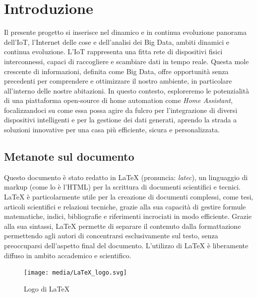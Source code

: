 \documentclass[11pt, a4paper]{article}
\begin{document}
\section{Introduzione}
Il presente progetto si inserisce nel dinamico 
e in continua evoluzione panorama dell'IoT, l'Internet delle cose
 e dell'analisi dei Big Data, ambiti dinamici e continua evoluzione. 
L'IoT rappresenta una fitta rete di dispositivi 
fisici interconnessi, capaci di raccogliere e 
scambiare dati in tempo reale. Questa mole crescente 
di informazioni, definita come Big Data, offre opportunità 
senza precedenti per comprendere e ottimizzare il nostro ambiente, 
in particolare all'interno delle nostre abitazioni. 
In questo contesto, esploreremo le potenzialità di una 
piattaforma open-source di home automation come \textit{Home Assistant}, 
focalizzandoci su come essa possa agire da fulcro per l'integrazione 
di diversi dispositivi intelligenti e per la gestione dei dati generati, 
aprendo la strada a soluzioni innovative per una casa più efficiente, 
sicura e personalizzata.

\subsection*{Metanote sul documento}
Questo documento è stato redatto in LaTeX (pronuncia: \textit{latec}), un linguaggio di markup
(come lo è l'HTML) per la scrittura di documenti scientifici e tecnici.
LaTeX è particolarmente utile per la creazione di documenti complessi, come tesi, articoli scientifici e relazioni tecniche, 
grazie alla sua capacità di gestire formule matematiche, indici, bibliografie e riferimenti incrociati in modo efficiente.
Grazie alla sua sintassi, LaTeX permette di separare il contenuto dalla formattazione permettendo
agli autori di concentrarsi esclusivamente sul testo, senza preoccuparsi dell'aspetto final del documento.
L'utilizzo di LaTeX è liberamente diffuso in ambito accademico e scientifico.

\begin{figure}[H]

    \centering
    \texttt{[image: media/LaTeX\_logo.svg]}
    \caption{Logo di LaTeX}
    \label{fig:latex-logo}

\end{figure}
\end{document}
